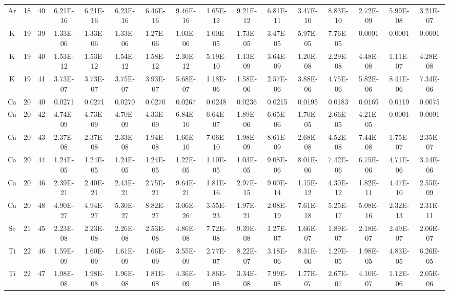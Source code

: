 {\begin{tabular}{|c|c|c|c|c|c|c|c|c|c|c|c|c|c|c|c|}
Ar & 18 & 40   & 6.21E-16  & 6.21E-16  & 6.23E-16  & 6.46E-16  & 9.46E-16  & 1.65E-12  & 9.21E-12  & 6.81E-11  & 3.47E-10  & 8.83E-10  & 2.72E-09  & 5.99E-08  & 3.21E-07  \\
K  & 19 & 39   & 1.33E-06  & 1.33E-06  & 1.33E-06  & 1.27E-06  & 1.03E-06  & 1.00E-05  & 1.73E-05  & 3.47E-05  & 5.97E-05  & 7.76E-05  & 0.0001    & 0.0001    & 0.0001    \\
K  & 19 & 40   & 1.53E-12  & 1.53E-12  & 1.54E-12  & 1.58E-12  & 2.30E-12  & 5.19E-10  & 1.13E-09  & 3.64E-09  & 1.20E-08  & 2.29E-08  & 4.48E-08  & 1.11E-07  & 4.28E-08  \\
K  & 19 & 41   & 3.73E-07  & 3.73E-07  & 3.75E-07  & 3.93E-07  & 5.68E-07  & 1.18E-06  & 1.58E-06  & 2.57E-06  & 3.88E-06  & 4.75E-06  & 5.82E-06  & 8.41E-06  & 7.34E-06  \\
Ca & 20 & 40   & 0.0271    & 0.0271    & 0.0270    & 0.0270    & 0.0267    & 0.0248    & 0.0236    & 0.0215    & 0.0195    & 0.0183    & 0.0169    & 0.0119    & 0.0075    \\
Ca & 20 & 42   & 4.74E-09  & 4.73E-09  & 4.70E-09  & 4.33E-09  & 6.84E-10  & 6.64E-07  & 1.89E-06  & 6.65E-06  & 1.70E-05  & 2.66E-05  & 4.21E-05  & 0.0001    & 0.0001    \\
Ca & 20 & 43   & 2.37E-08  & 2.37E-08  & 2.33E-08  & 1.94E-08  & 1.66E-10  & 7.06E-10  & 1.98E-09  & 8.61E-09  & 2.68E-08  & 4.52E-08  & 7.44E-08  & 1.75E-07  & 2.35E-07  \\
Ca & 20 & 44   & 1.24E-05  & 1.24E-05  & 1.24E-05  & 1.24E-05  & 1.22E-05  & 1.10E-05  & 1.03E-05  & 9.08E-06  & 8.01E-06  & 7.42E-06  & 6.75E-06  & 4.71E-06  & 3.14E-06  \\
Ca & 20 & 46   & 2.39E-21  & 2.40E-21  & 2.43E-21  & 2.75E-21  & 9.64E-21  & 1.81E-16  & 2.97E-15  & 9.00E-14  & 1.15E-12  & 4.30E-12  & 1.82E-11  & 4.47E-10  & 2.55E-09  \\
Ca & 20 & 48   & 4.90E-27  & 4.94E-27  & 5.30E-27  & 8.82E-27  & 3.06E-26  & 3.55E-23  & 1.97E-21  & 2.08E-19  & 7.61E-18  & 5.25E-17  & 5.08E-16  & 2.32E-13  & 2.31E-11  \\
Sc & 21 & 45   & 2.23E-08  & 2.23E-08  & 2.26E-08  & 2.53E-08  & 4.86E-08  & 7.72E-08  & 9.39E-08  & 1.27E-07  & 1.66E-07  & 1.89E-07  & 2.18E-07  & 2.49E-07  & 2.06E-07  \\
Ti & 22 & 46   & 1.59E-09  & 1.60E-09  & 1.61E-09  & 1.66E-09  & 3.55E-09  & 2.77E-07  & 8.22E-07  & 3.18E-06  & 8.31E-06  & 1.29E-05  & 1.98E-05  & 4.83E-05  & 6.26E-05  \\
Ti & 22 & 47   & 1.98E-08  & 1.98E-08  & 1.96E-08  & 1.81E-08  & 4.36E-09  & 1.86E-08  & 3.34E-08  & 7.99E-08  & 1.77E-07  & 2.67E-07  & 4.10E-07  & 1.12E-06  & 2.05E-06  \\

\end{tabular}}
